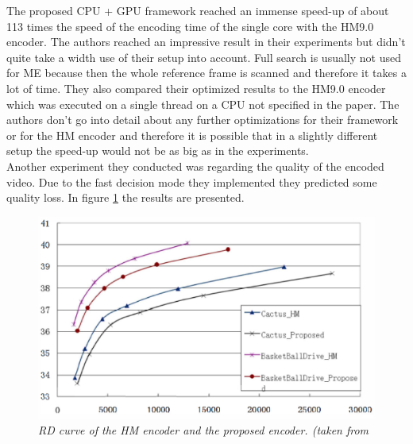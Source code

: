 The proposed CPU + GPU framework reached an immense speed-up of about 113 times the speed of the encoding time of the single core with the HM9.0 encoder. The authors reached an impressive result in their experiments but didn't quite take a width use of their setup into account. Full search is usually not used for ME because then the whole reference frame is scanned and therefore it takes a lot of time. They also compared their optimized results to the HM9.0 encoder which was executed on a single thread on a CPU not specified in the paper. The authors don't go into detail about any further optimizations for their framework or for the HM encoder and therefore it is possible that in a slightly different setup the speed-up would not be as big as in the experiments. \\
Another experiment they conducted was regarding the quality of the encoded video. Due to the fast decision mode they implemented they predicted some quality loss. In figure \ref{hevc_rd_result} the results are presented.\\

\begin{figure}[H]
\centerline{\includegraphics[scale=0.3]{pics/hevc_rd_result}} %

\caption{\label{hevc_rd_result}{\it RD curve of the HM encoder and the proposed encoder. (taken from \cite{Paper3}}}
\end{figure}

